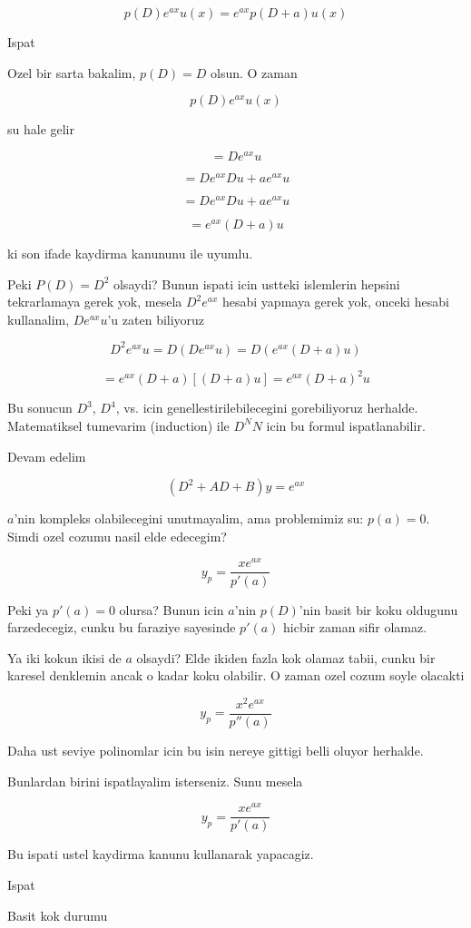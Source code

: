 \documentclass[12pt,fleqn]{article}
\begin{document}
\[ p(D)e^{ax}u(x) = e^{ax}p(D+a)u(x)\]

Ispat

Ozel bir sarta bakalim, $p(D) = D$ olsun. O zaman 

\[ p(D)e^{ax}u(x) \]

su hale gelir

\[ = De^{ax}u\]

\[ = De^{ax}Du + ae^{ax}u \]

\[ = De^{ax}Du + ae^{ax}u \]

\[ = e^{ax}(D + a)u \]

ki son ifade kaydirma kanununu ile uyumlu. 

Peki $P(D) = D^2$ olsaydi? Bunun ispati icin ustteki islemlerin hepsini
tekrarlamaya gerek yok, mesela $D^2e^{ax}$ hesabi yapmaya gerek yok,
onceki hesabi kullanalim, $De^{ax}u$'u zaten biliyoruz

\[  D^2e^{ax}u = D(De^{ax}u) = D(e^{ax}(D+a)u)  \]

\[ = e^{ax}(D+a)[(D+a)u] = e^{ax}(D+a)^2u \]

Bu sonucun $D^3$, $D^4$, vs. icin genellestirilebilecegini gorebiliyoruz
herhalde. Matematiksel tumevarim (induction) ile $D^NN$ icin bu formul
ispatlanabilir. 

Devam edelim

\[ (D^2+AD+B)y = e^{ax} \]

$a$'nin kompleks olabilecegini unutmayalim, ama problemimiz su: $p(a) =
0$.
Simdi ozel cozumu nasil elde edecegim? 

\[ y_p = \frac{x e^{ax}}{p'(a)} \]

Peki ya $p'(a) = 0$  olursa? Bunun icin $a$'nin $p(D)$'nin basit bir koku
oldugunu farzedecegiz, cunku bu faraziye sayesinde $p'(a)$ hicbir zaman
sifir olamaz. 

Ya iki kokun ikisi de $a$ olsaydi? Elde ikiden fazla kok olamaz tabii,
cunku bir karesel denklemin ancak o kadar koku olabilir. O zaman ozel cozum
soyle olacakti

\[ y_p = \frac{x^2e^{ax}}{p''(a)} \]

Daha ust seviye polinomlar icin bu isin nereye gittigi belli oluyor
herhalde. 

Bunlardan birini ispatlayalim isterseniz. Sunu mesela

\[ y_p = \frac{x e^{ax}}{p'(a)} \]

Bu ispati ustel kaydirma kanunu kullanarak yapacagiz. 

Ispat

Basit kok durumu
\end{document}
